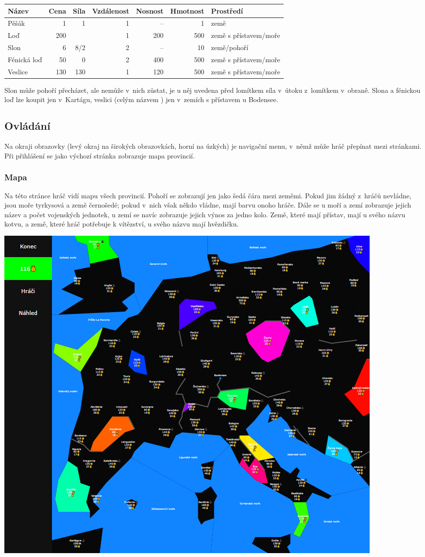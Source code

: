\documentclass[a4paper,12pt]{article}
\begin{document}
\begin{tabular}{l r r r r r l}
Název		& Cena	& Síla	& Vzdálenost	&Nosnost& Hmotnost	& Prostředí\\ \hline
Pěšák		& 1		& 1		& 1			& --		& 1			& země\\
Loď			& 200	& 		& 1			& 200	& 500		& země s přístavem/moře\\
Slon			& 6		& 8/2	& 2			& --		& 10			& země/pohoří\\
Fénická loď	& 50		& 0		& 2			& 400	& 500		& země s přístavem/moře\\
Veslice		& 130	& 130	& 1			& 120	& 500		& země s přístavem/moře\\
\end{tabular}

Slon může pohoří přecházet, ale nemůže v~nich zůstat, je u něj uvedena před lomítkem síla v~útoku z~lomítkem v~obraně. Slona a fénickou loď lze koupit jen v~Kartágu, veslici (celým názvem ) jen v~zemích s přístavem u Bodensee.

\subsection{Ovládání}
Na okraji obrazovky (levý okraj na širokých obrazovkách, horní na úzkých) je navigační menu, v~němž může hráč přepínat mezi stránkami. Při přihlášení se jako výchozí stránka zobrazuje mapa provincií.
\subsubsection{Mapa}
Na této stránce hráč vidí mapu všech provincií. Pohoří se zobrazují jen jako šedá čára mezi zeměmi. Pokud jim žádný z~hráčů nevládne, jsou moře tyrkysová a země černošedé; pokud v~nich však někdo vládne, mají barvu onoho hráče. Dále se u moří a zemí zobrazuje jejich název a počet vojenských jednotek, u zemí se navíc zobrazuje jejich výnos za jedno kolo. Země, které mají přístav, mají u svého názvu kotvu, a země, které hráč potřebuje k vítězství, u svého názvu mají hvězdičku.


\includegraphics[width=\textwidth]{ProvinceMap.png}
\end{document}
